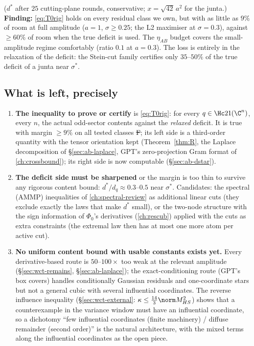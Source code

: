 ($d^*$ after $25$ cutting-plane rounds, conservative; $x=\sqrt{42}\,a^2$ for the junta.) \textbf{Finding:} \eqref{eq:T0rig} holds on every residual class we own, but with as little as
$9\%$ of room at full amplitude ($a=1$, $\sigma\ge0.25$; the L2 maximiser at $\sigma=0.3$), against $\ge60\%$ of room when the true deficit is used. The $\eta_{AB}$ budget covers the
small-amplitude regime comfortably (ratio $0.1$ at $a=0.3$). The loss is entirely in the relaxation of the deficit: the Stein-cut family certifies only $35$--$50\%$ of the true deficit
of a junta near $\sigma^*$.

\subsection{What is left, precisely}\label{sec:ab-left}
\begin{enumerate}
\item \textbf{The inequality to prove or certify} is \eqref{eq:T0rig}: for every $q\in\Hc21(\C^n)$, every $n$, the actual odd-sector contents against the \emph{relaxed} deficit. It is
true with margin $\ge9\%$ on all tested classes \st{F}; its left side is a third-order quantity with the tensor orientation kept (Theorem~\ref{thm:R}, the Laplace decomposition
of \S\ref{sec:ab-laplace}, GPT's zero-projection Gram format of \autoref{ch:crossbound}); its right side is now computable (\S\ref{sec:ab-dstar}).
\item \textbf{The deficit side must be sharpened} or the margin is too thin to survive any rigorous content bound: $d^*/d_q\approx0.3$--$0.5$ near $\sigma^*$. Candidates: the spectral
(AMMP) inequalities of \autoref{ch:spectral-review} as additional linear cuts (they exclude exactly the laws that make $d^*$ small), or the two-node structure with the sign information
of $\Phi_0$'s derivatives (\autoref{ch:rescub}) applied with the cuts as extra constraints (the extremal law then has at most one more atom per active cut).
\item \textbf{No uniform content bound with usable constants exists yet.} Every derivative-based route is $50$--$100\times$ too weak at the relevant amplitude
(\S\ref{sec:wct-remains}, \S\ref{sec:ab-laplace}); the exact-conditioning route (GPT's box covers) handles conditionally Gaussian residuals and one-coordinate stars but not a
general cubic with several influential coordinates. The reverse influence inequality (\S\ref{sec:wct-external}: $\kappa\le\frac{14}3\norm M^2_{HS}$) shows that a counterexample
in the variance window must have an influential coordinate, so a dichotomy ``few influential coordinates (finite machinery) / diffuse remainder (second order)'' is the natural
architecture, with the mixed terms along the influential coordinates as the open piece.
\end{enumerate}

